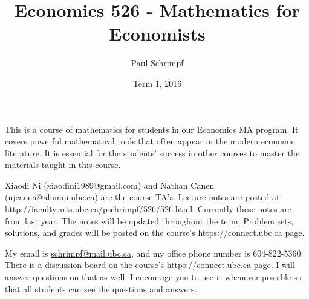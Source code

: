 \documentclass[10pt]{article}
\title{Economics 526 - Mathematics for Economists}
\date{Term 1, 2016}
\author{Paul Schrimpf}
\begin{document}
\maketitle

This is a course of mathematics for students in our Economics MA
program. It covers powerful mathematical tools that often appear
in the modern economic literature. It is essential for the students'
success in other courses to master the materials taught in this
course.

Xiaodi Ni (xiaodini1989@gmail.com) and Nathan Canen
(njcanen@alumni.ubc.ca) 
are the course TA's.  Lecture notes are posted
at \url{http://faculty.arts.ubc.ca/pschrimpf/526/526.html}. Currently
these notes are from last year. The notes will be updated throughout
the term. Problem sets, solutions, and grades will be posted on the
course's \url{https://connect.ubc.ca} page.

My email is
\href{mailto:schrimp@mail.ubc.ca}{schrimpf@mail.ubc.ca}, and my office
phone number is 604-822-5360. There is a discussion board on the
course's \url{https://connect.ubc.ca} page. I will answer questions on
that as well. I encourage you to use it whenever possible so that
all students can see the questions and answers.
\end{document}
